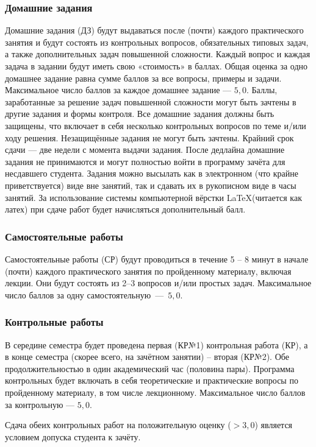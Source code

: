 \documentclass[11pt, a4paper]{article}
\theoremstyle{plain}
\theoremstyle{definition}
\theoremstyle{remark}
\begin{document}
\subsubsection{Домашние задания}
Домашние задания (ДЗ) будут выдаваться после (почти) каждого практического занятия и будут
состоять из контрольных вопросов, обязательных типовых задач, а также дополнительных задач
повышенной сложности. Каждый вопрос и каждая задача в задании будут иметь свою «стоимость» в баллах.
Общая оценка за одно домашнее задание равна сумме баллов за все вопросы, примеры и задачи.
Максимальное число баллов за каждое домашнее задание --- $5,0$. Баллы, заработанные за решение задач
повышенной сложности могут быть зачтены в другие задания и формы контроля. Все домашние задания
должны быть защищены, что включает в себя несколько контрольных вопросов по теме и/или ходу решения.
Незащищённые задания не могут быть зачтены. Крайний срок сдачи --- две недели с момента выдачи
задания. После дедлайна домашние задания не принимаются и могут полностью войти в программу зачёта
для несдавшего студента. Задания можно высылать как в электронном (что крайне приветствуется) виде
вне занятий, так и сдавать их в рукописном виде в часы занятий. За использование системы
компьютерной вёрстки \LaTeX (читается как латех) при сдаче работ будет начисляться дополнительный балл.

\subsubsection{Самостоятельные работы}
Самостоятельные работы (СР) будут проводиться в течение 5 -- 8 минут в начале (почти) каждого
практического занятия по пройденному материалу, включая лекции. Они будут состоять из 2--3 вопросов
и/или простых задач. Максимальное число баллов за одну самостоятельную~---~$5,0$. 

\subsubsection{Контрольные работы}
В середине семестра будет проведена первая (КР№1) контрольная работа (КР), а в конце семестра
(скорее всего, на зачётном занятии) -- вторая (КР№2). Обе продолжительностью в один академический
час (половина пары). Программа
контрольных будет включать в себя теоретические и практические вопросы по пройденному материалу, в
том числе лекционному. Максимальное число баллов за контрольную --- $5,0$.\par
Сдача обеих контрольных работ на
положительную оценку ($> 3,0$) является условием допуска студента к зачёту.
\end{document}
